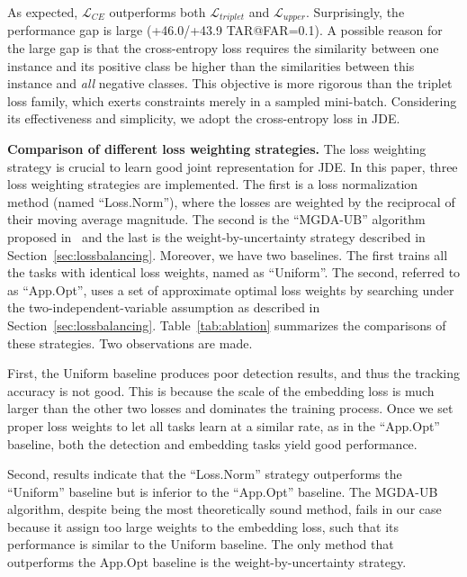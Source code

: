 \documentclass[runningheads]{llncs}
\begin{document}
As expected, $\mathcal{L}_{CE}$ outperforms both $\mathcal{L}_{triplet}$ and $\mathcal{L}_{upper}$. Surprisingly, the performance gap is large (+46.0/+43.9 TAR@FAR=0.1). A possible reason for the large gap is that the cross-entropy loss requires the similarity between one instance and its positive class be higher than the similarities between this instance and \emph{all}  negative classes. This objective is more rigorous than the triplet loss family, which exerts constraints merely in a sampled mini-batch. Considering its effectiveness and simplicity, we adopt the cross-entropy loss in JDE. 





\textbf{Comparison of different loss weighting strategies.}
The loss weighting strategy is crucial to learn good joint representation for JDE.
In this paper, three loss weighting strategies are implemented. The first is a loss normalization method (named ``Loss.Norm''), where the losses are weighted by the reciprocal of their moving average magnitude. The second is the ``MGDA-UB'' algorithm proposed in~\cite{MGDA} and the last is the weight-by-uncertainty strategy described in Section~\ref{sec:lossbalancing}.
Moreover, we have two baselines. The first trains all the tasks with identical loss weights, named as ``Uniform''. The second, referred to as ``App.Opt'', uses a set of approximate optimal loss weights by searching under the two-independent-variable assumption as described in Section~\ref{sec:lossbalancing}. Table~\ref{tab:ablation} summarizes the comparisons of these strategies. Two observations are made. 

First, the Uniform baseline produces poor detection results, and thus the tracking accuracy is not good. This is because the scale of the embedding loss is much larger than the other two losses and dominates the training process. Once we set proper loss weights to let all tasks learn at a similar rate, as in the ``App.Opt'' baseline, both the detection and embedding tasks yield good performance. 

Second, 
results indicate that the ``Loss.Norm'' strategy outperforms the ``Uniform'' baseline but is inferior to the ``App.Opt'' baseline. The MGDA-UB algorithm, despite being the most theoretically sound method, fails in our case because it assign too large weights to the embedding loss, such that its performance is similar to the Uniform baseline. The only method that outperforms the App.Opt baseline is the weight-by-uncertainty strategy. 
\end{document}
